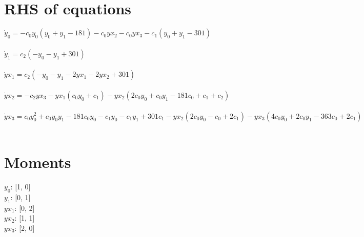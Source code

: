 \documentclass{article}
\begin{document}
\section*{RHS of equations}
$\dot y_{0} = - c_{0} y_{0} \left(y_{0} + y_{1} -181\right) - c_{0} yx_{2} - c_{0} yx_{3} - c_{1} \left(y_{0} + y_{1} -301\right)$\\\\$\dot y_{1} = c_{2} \left(- y_{0} - y_{1} + 301\right)$\\\\$\dot yx_{1} = c_{2} \left(- y_{0} - y_{1} - 2 yx_{1} - 2 yx_{2} + 301\right)$\\\\$\dot yx_{2} = - c_{2} yx_{3} - yx_{1} \left(c_{0} y_{0} + c_{1}\right) - yx_{2} \left(2 c_{0} y_{0} + c_{0} y_{1} - 181 c_{0} + c_{1} + c_{2}\right)$\\\\$\dot yx_{3} = c_{0} y_{0}^{2} + c_{0} y_{0} y_{1} - 181 c_{0} y_{0} - c_{1} y_{0} - c_{1} y_{1} + 301 c_{1} - yx_{2} \left(2 c_{0} y_{0} - c_{0} + 2 c_{1}\right) - yx_{3} \left(4 c_{0} y_{0} + 2 c_{0} y_{1} - 363 c_{0} + 2 c_{1}\right)$\\\\
\section*{Moments}

$y_{0}$: {[1, 0]}\\
$y_{1}$: {[0, 1]}\\
$yx_{1}$: {[0, 2]}\\
$yx_{2}$: {[1, 1]}\\
$yx_{3}$: {[2, 0]}\\
\end{document}
